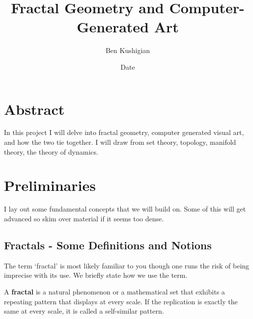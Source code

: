 \documentclass[11pt,oneside,final]{article}
\begin{document}
\title{Fractal Geometry and Computer-Generated Art}
\author{Ben Kushigian}
\date{Date}
\maketitle
\tableofcontents








\section{Abstract}

In this project I will delve into fractal geometry, computer generated visual
art, and how the two tie together. I will draw from set theory, topology,
manifold theory, the theory of dynamics. 







\section{Preliminaries}
I lay out some fundamental concepts that we will build on. Some of this will get 
advanced so skim over material if it seems too dense.



\subsection{Fractals - Some Definitions and Notions}
The term `fractal' is most likely familiar to you though one runs the risk of
being imprecise with its use. We briefly state how we use the term.\\
\begin{dfn} A \textbf{fractal} is a natural phenomenon or a mathematical set
	that exhibits a repeating pattern that displays at every scale. If the 
	replication is exactly the same at every scale, it is called a self-similar
	pattern.
	\cite{wikipedia-fractals}\\

\end{dfn}
\end{document}
